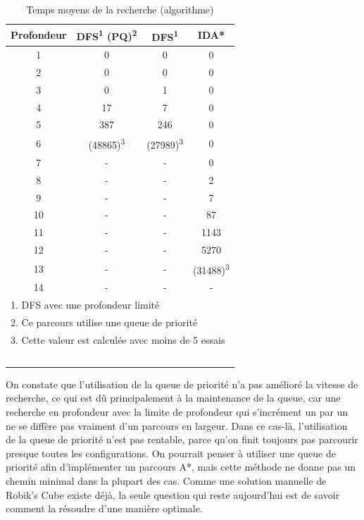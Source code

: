 \documentclass[fleqn,10pt,french]{SelfArx} %
\begin{document}
\begin{table}[htbp]
\centering
\begin{tabular}{cccc}
\hline
\rowcolor{blue!20} \rule{0pt}{12pt} \textbf{Profondeur} & \textbf{DFS\textsuperscript{1} (PQ)\textsuperscript{2}} & \textbf{DFS}\textsuperscript{1} & \textbf{IDA*}\\
\hline
1 & 0 & 0 & 0  \\
2 & 0 & 0 & 0 \\
3 & 0 & 1 & 0 \\
4 & 17 & 7 & 0 \\
5 & 387 & 246 & 0 \\
6 & (48865)\textsuperscript{3} & (27989)\textsuperscript{3} & 0  \\
7 & - & - & 0 \\
8 & - & - & 2 \\
9 & - & - & 7 \\
10 & - & - & 87 \\
11 & - & - & 1143 \\
12 & - & - & 5270 \\
13 & - & - & (31488)\textsuperscript{3} \\
14 & - & - & - \\
\hline
\multicolumn{4}{l}{\small{1. DFS avec une profondeur limité}} \\
\multicolumn{4}{l}{\small{2. Ce parcours utilise une queue de priorité}} \\
\multicolumn{4}{l}{\small{3. Cette valeur est calculée avec moins de 5 essais}} \\
\hline
~\\
\end{tabular}
\caption{Temps moyens de la recherche (algorithme)}
\end{table}

\indent
On constate que l’utilisation de la queue de priorité n’a pas amélioré la vitesse de recherche, ce qui est dû principalement à la maintenance de la queue, car une recherche en profondeur avec la limite de profondeur qui s’incrément un par un ne se diffère pas vraiment d’un parcours en largeur. Dans ce cas-là, l’utilisation de la queue de priorité n’est pas rentable, parce qu’on finit toujours pas parcourir presque toutes les configurations. On pourrait penser à utiliser une queue de priorité afin d’implémenter un parcours A*, mais cette méthode ne donne pas un chemin minimal dans la plupart des cas. Comme une solution manuelle de Robik’s Cube existe déjà, la seule question qui reste aujourd’hui est de savoir comment la résoudre d’une manière optimale.
\end{document}
